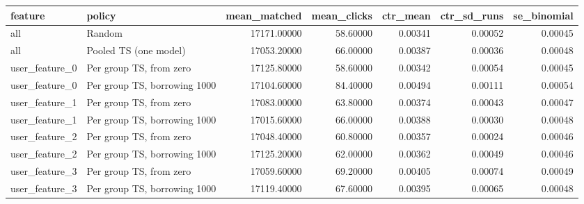 \begin{tabular}{llrrrrr}
\toprule
feature & policy & mean\_matched & mean\_clicks & ctr\_mean & ctr\_sd\_runs & se\_binomial \\
\midrule
all & Random & 17171.00000 & 58.60000 & 0.00341 & 0.00052 & 0.00045 \\
all & Pooled TS (one model) & 17053.20000 & 66.00000 & 0.00387 & 0.00036 & 0.00048 \\
user\_feature\_0 & Per group TS, from zero & 17125.80000 & 58.60000 & 0.00342 & 0.00054 & 0.00045 \\
user\_feature\_0 & Per group TS, borrowing 1000 & 17104.60000 & 84.40000 & 0.00494 & 0.00111 & 0.00054 \\
user\_feature\_1 & Per group TS, from zero & 17083.00000 & 63.80000 & 0.00374 & 0.00043 & 0.00047 \\
user\_feature\_1 & Per group TS, borrowing 1000 & 17015.60000 & 66.00000 & 0.00388 & 0.00030 & 0.00048 \\
user\_feature\_2 & Per group TS, from zero & 17048.40000 & 60.80000 & 0.00357 & 0.00024 & 0.00046 \\
user\_feature\_2 & Per group TS, borrowing 1000 & 17125.20000 & 62.00000 & 0.00362 & 0.00049 & 0.00046 \\
user\_feature\_3 & Per group TS, from zero & 17059.60000 & 69.20000 & 0.00405 & 0.00074 & 0.00049 \\
user\_feature\_3 & Per group TS, borrowing 1000 & 17119.40000 & 67.60000 & 0.00395 & 0.00065 & 0.00048 \\
\bottomrule
\end{tabular}
